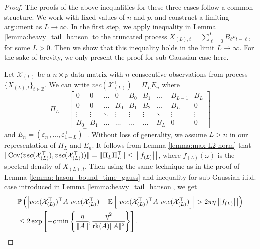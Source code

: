 \begin{proof}
The proofs of the above inequalities for these three cases follow a common structure. We work with fixed values of $n$ and $p$, and construct a limiting argument as $L \rightarrow \infty$.  In the first step, we apply inequality in Lemma  \ref{lemma:heavy_tail_hanson} to the truncated process $X_{(L),t} = \sum_{\ell=0}^L B_\ell \varepsilon_{t-\ell}$, for some $L>0$. Then we show that this inequality holds in the limit  $L\rightarrow \infty$. For the sake of brevity, we only present the proof for sub-Gaussian case here. 

Let $\mathcal{X}_{(L)}$ be a $n \times p$ data matrix with $n$ consecutive observations from process $\{X_{(L), t}\}_{t \in \mathbb{Z}}$.  We can write 
$vec(\mathcal{X}_{(L)}^\top) = \Pi_L E_n$ where 
\begin{equation*}
    \Pi_L = \begin{bmatrix}
    0 & 0 & \dots & 0 & B_0 & B_1 & \dots & B_{L-1} & B_L \\
    0 & 0 & \dots & B_0 & B_1 & B_2 & \dots & B_L & 0 \\
    \vdots & \vdots & \ddots & \vdots & \vdots & \vdots &\ddots & \vdots & \vdots \\
    B_0 & B_1 & \dots & \dots &  \dots & \dots & B_L & 0  & 0
    \end{bmatrix}
\end{equation*}
and $E_n = (\varepsilon_n^\top, \dots, \varepsilon^\top_{1-L})^\top$. Without loss of generality, we assume $L>n$ in our representation of $\Pi_L$ and $E_n$. It follows from Lemma  \ref{lemma:max-L2-norm} that 
$\|\mbox{Cov}(vec(\mathcal{X}_{(L)}^\top), vec(\mathcal{X}_{(L)}^\top))\| = \|\Pi_L\Pi_L^\top\| \le {\left\vert\kern-0.25ex\left\vert\kern-0.25ex\left\vert f_{(L)} \right\vert\kern-0.25ex\right\vert\kern-0.25ex\right\vert}$, where  $f_{(L)}(\omega)$ is the spectral density of $X_{(L), t}$. Then using the same technique as in the proof of Lemma \ref{lemma: hason_bound_time_gauss} and inequality for sub-Gaussian i.i.d. case introduced in Lemma \ref{lemma:heavy_tail_hanson}, we get 
\begin{equation}
\label{eq:sub_gauss_time_hanson_wright_truncated}
\begin{aligned}
&\mathbb{P}\left(\left|vec(\mathcal{X}_{(L)}^\top)^\top A ~vec(\mathcal{X}_{(L)}^\top) - \mathbb{E} \left[~vec(\mathcal{X}_{(L)}^\top )^\top A ~vec(\mathcal{X}_{(L)}^\top)\right]\right| >2\pi \eta \vertiii{f_{(L)}} \right)\\
&\le 2\exp\left[-c\min\left\{\cfrac{\eta}{\|A\|}, \cfrac{\eta^2}{\rank(A)\|A\|^2}\right\}\right].
\end{aligned}

\end{equation}
\end{proof}
